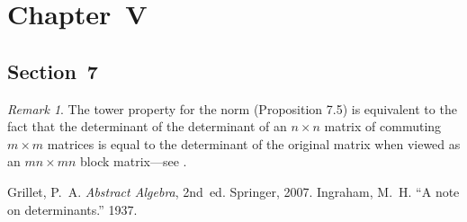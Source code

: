 \documentclass[letterpaper,12pt]{article}
\theoremstyle{definition}
\theoremstyle{remark}
\newtheorem*{rmk}{Remark}
\theoremstyle{plain}
\begin{document}
\section*{Chapter~V}
\subsection*{Section~7}
\begin{rmk}
The tower property for the norm (Proposition 7.5) is equivalent to the fact that the determinant of the determinant of an \(n\times n\) matrix of commuting \(m\times m\) matrices is equal to the determinant of the original matrix when viewed as an \(mn\times mn\) block matrix---see \cite{ingraham}.
\end{rmk}

\begin{thebibliography}{0}
 Grillet, P.~A. \textit{Abstract Algebra}, 2nd~ed. Springer, 2007.
 Ingraham, M.~H. ``A note on determinants.'' 1937.
\end{thebibliography}
\end{document}
